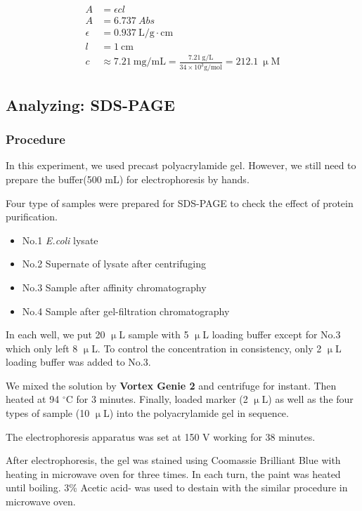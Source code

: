 \documentclass{report}
\begin{document}
\begin{align}
    A &= \epsilon cl \\
    A &= 6.737\ Abs \\
    \epsilon &= 0.937\ \text{L/g}\cdot\text{cm} \\
    l &= 1\ \text{cm}\\
    c &\approx 7.21\ \text{mg/mL}=\frac{7.21\ \text{g/L}}{34\times 10^3 \text{g/mol}}=212.1\ \upmu\text{M}    
\end{align}


\subsection{Analyzing: SDS-PAGE}

\subsubsection{Procedure}
In this experiment, we used precast polyacrylamide gel.
However, we still need to prepare the buffer(500 mL) for electrophoresis by hands.

Four type of samples were prepared for SDS-PAGE to check the effect of protein purification.

\begin{itemize}
    \item No.1 \textit{E.coli} lysate
    \item No.2 Supernate of lysate after centrifuging
    \item No.3 Sample after affinity chromatography
    \item No.4 Sample after gel-filtration chromatography
\end{itemize}

In each well, we put 20 $\upmu$L sample with 5 $\upmu$L loading buffer except for No.3 which only left 8 $\upmu$L.
To control the concentration in consistency, only 2 $\upmu$L loading buffer was added to No.3.

We mixed the solution by \textbf{Vortex Genie 2} and centrifuge for instant.
Then heated at 94 $^\circ$C for 3 minutes.
Finally, loaded marker (2 $\upmu$L) as well as the four types of sample (10 $\upmu$L) into the polyacrylamide gel in sequence.

The electrophoresis apparatus was set at 150 V working for 38 minutes.

After electrophoresis, the gel was stained using Coomassie Brilliant Blue with heating in microwave oven for three times.
In each turn, the paint was heated until boiling.
3\% Acetic acid- was used to destain with the similar procedure in microwave oven.
\end{document}
